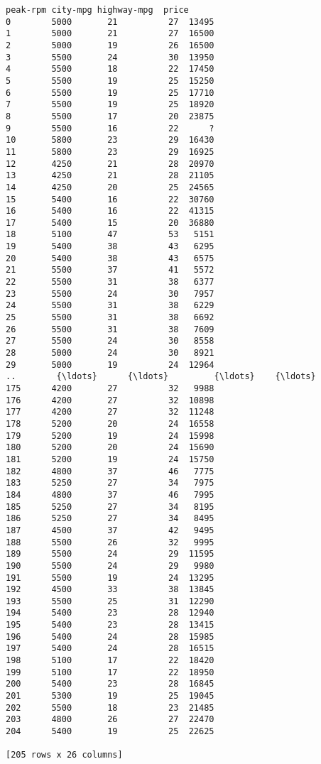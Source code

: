 \documentclass[11pt]{article}
\begin{document}
\begin{tcolorbox}[breakable, boxrule=.5pt, size=fbox, pad at break*=1mm, opacityfill=0]
\begin{Verbatim}[commandchars=\\\{\}]
     peak-rpm city-mpg highway-mpg  price
0        5000       21          27  13495
1        5000       21          27  16500
2        5000       19          26  16500
3        5500       24          30  13950
4        5500       18          22  17450
5        5500       19          25  15250
6        5500       19          25  17710
7        5500       19          25  18920
8        5500       17          20  23875
9        5500       16          22      ?
10       5800       23          29  16430
11       5800       23          29  16925
12       4250       21          28  20970
13       4250       21          28  21105
14       4250       20          25  24565
15       5400       16          22  30760
16       5400       16          22  41315
17       5400       15          20  36880
18       5100       47          53   5151
19       5400       38          43   6295
20       5400       38          43   6575
21       5500       37          41   5572
22       5500       31          38   6377
23       5500       24          30   7957
24       5500       31          38   6229
25       5500       31          38   6692
26       5500       31          38   7609
27       5500       24          30   8558
28       5000       24          30   8921
29       5000       19          24  12964
..        {\ldots}      {\ldots}         {\ldots}    {\ldots}
175      4200       27          32   9988
176      4200       27          32  10898
177      4200       27          32  11248
178      5200       20          24  16558
179      5200       19          24  15998
180      5200       20          24  15690
181      5200       19          24  15750
182      4800       37          46   7775
183      5250       27          34   7975
184      4800       37          46   7995
185      5250       27          34   8195
186      5250       27          34   8495
187      4500       37          42   9495
188      5500       26          32   9995
189      5500       24          29  11595
190      5500       24          29   9980
191      5500       19          24  13295
192      4500       33          38  13845
193      5500       25          31  12290
194      5400       23          28  12940
195      5400       23          28  13415
196      5400       24          28  15985
197      5400       24          28  16515
198      5100       17          22  18420
199      5100       17          22  18950
200      5400       23          28  16845
201      5300       19          25  19045
202      5500       18          23  21485
203      4800       26          27  22470
204      5400       19          25  22625

[205 rows x 26 columns]
\end{Verbatim}
\end{tcolorbox}
        
\end{document}

